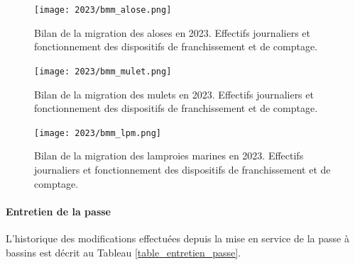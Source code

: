 \documentclass[11pt,twocolumn,titlepage,twoside]{article}\usepackage[]{graphicx}\usepackage[]{color}
\begin{document}




\begin{figure}[hp]
\centering
\texttt{[image: 2023/bmm\_alose.png]}
\caption{Bilan de la migration des aloses en 2023. Effectifs journaliers et
fonctionnement des dispositifs de franchissement et de comptage.}
\label{bmm_alose}
\end{figure}

\begin{figure}[hp]
\centering
\texttt{[image: 2023/bmm\_mulet.png]}
\caption{Bilan de la migration des mulets en 2023. Effectifs journaliers et
fonctionnement des dispositifs de franchissement et de comptage.}
\label{bmm_mulet}
\end{figure}


\begin{figure}[hp]
\centering
\texttt{[image: 2023/bmm\_lpm.png]}
\caption{Bilan de la migration des lamproies marines en 2023. Effectifs
journaliers et fonctionnement des dispositifs de franchissement et de comptage.}
\label{bmm_lpm}
\end{figure}




\paragraph{Entretien de la passe}
L'historique des modifications effectuées depuis la mise en service de
la passe à bassins est décrit au Tableau \ref{table_entretien_passe}.
\end{document}
